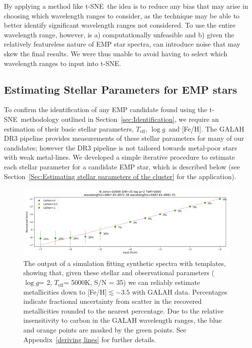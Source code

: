 \documentclass[]{aastex631}
\newcommand{\ts}{t-SNE\xspace}
\newcommand{\emp}{EMP star\xspace}
\newcommand{\emps}{EMP stars\xspace}
\newcommand{\logg}{\ensuremath{\log g}\xspace}
\newcommand{\teff}{\ensuremath{T_{\mathrm{eff}}}\xspace}
\newcommand{\feh}{[Fe/H]\xspace}
\begin{document}
By applying a method like \ts \ the idea is to reduce any bias that may arise in choosing which wavelength ranges to consider, as the technique may be able to better identify significant wavelength ranges not considered. 
To use the entire wavelength range, however, is a) computationally unfeasible and b) given the relatively featureless nature of \emp spectra, can introduce noise that may skew the final results.
We were thus unable to avoid having to select which wavelength ranges to input into \ts.




\subsection{Estimating Stellar Parameters for \emps }\label{Sec:fitting routine}

To confirm the identification of any EMP candidate found using the \ts \ methodology outlined in Section~\ref{sec:Identification}, we require an estimation of their basic stellar parameters, \teff, \logg \ and \feh.
The GALAH DR3 pipeline provides measurements of these stellar parameters for many of our candidates; however the DR3 pipeline is not tailored towards metal-poor stars with weak metal-lines.
We developed a simple iterative procedure to estimate each stellar parameter for a candidate EMP star, which is described below (see Section~\ref{Sec:Estimating stellar parameters of the cluster} for the application).


\begin{figure}
    \centering
    \includegraphics[width=\linewidth]{Plots/sim_plots/Nsim10000_SN35_logg2_T5000_Thomas_4870_4890.jpg}
    \caption{The output of a simulation fitting synthetic spectra with templates, showing that, given these stellar and observational parameters (\logg = 2, \teff = 5000K, S/N = 35) we can reliably estimate metallicities down to \feh $\lesssim -3.5$ with GALAH data. Percentages indicate fractional uncertainty from scatter in the recovered metallicities rounded to the nearest percentage. Due to the relative insensitivity to carbon in the GALAH wavelength ranges, the blue and orange points are masked by the green points. See Appendix~\ref{deriving lines} for further details. }
    \label{fig:sim_example}
\end{figure}
\end{document}
